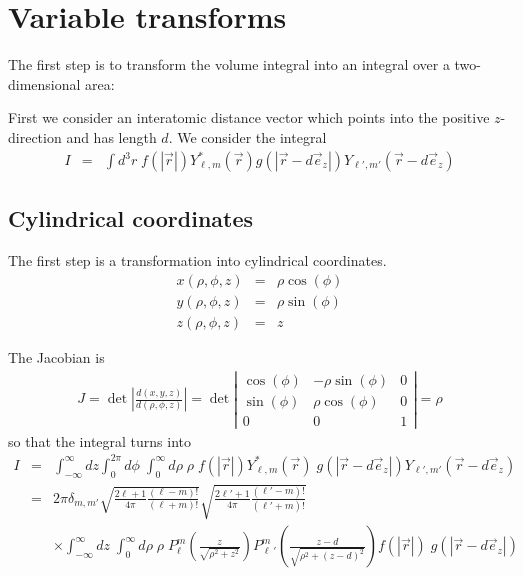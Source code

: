 \documentclass[11pt,a4paper]{report}
\begin{document}
\section{Variable transforms}
The first step is to transform the volume integral into an integral
over a two-dimensional area:

First we consider an interatomic distance vector which points into the
positive $z$-direction and has length $d$. We consider the integral
\begin{eqnarray*}
I&=&\int d^3r\; f(|\vec{r}|)Y^*_{\ell,m}(\vec{r})g(|\vec{r}-d\vec{e}_z|)
Y_{\ell',m'}(\vec{r}-d\vec{e}_z)
\end{eqnarray*}

\subsection{Cylindrical coordinates}
The first step is a transformation into cylindrical coordinates.
\begin{eqnarray*}
x(\rho,\phi,z)&=&\rho\cos(\phi)
\\
y(\rho,\phi,z)&=&\rho\sin(\phi)
\\
z(\rho,\phi,z)&=&z
\end{eqnarray*}

The Jacobian is 
\begin{eqnarray*}
J=
\det\left|\frac{d(x,y,z)}{d(\rho,\phi,z)}\right|=
\det\left|\begin{array}{ccc}\cos(\phi)& -\rho\sin(\phi)& 0\\
\sin(\phi)&\rho\cos(\phi)&0\\0&0&1\end{array}\right|
=\rho
\end{eqnarray*}
so that the integral turns into
\begin{eqnarray*}
I&=&\int_{-\infty}^\infty dz\int_0^{2\pi} d\phi\;
\int_0^\infty d\rho\;\rho\;
f(|\vec{r}|)Y^*_{\ell,m}(\vec{r})\;
g(|\vec{r}-d\vec{e}_z|)Y_{\ell',m'}(\vec{r}-d\vec{e}_z)
\\
&=&2\pi\delta_{m,m'}
\sqrt{\frac{2\ell+1}{4\pi}\frac{(\ell-m)!}{(\ell+m)!}}
\sqrt{\frac{2\ell'+1}{4\pi}\frac{(\ell'-m)!}{(\ell'+m)!}}
\\
&&\times\int_{-\infty}^\infty dz\;
\int_0^\infty d\rho\;\rho\; 
P^{m}_\ell\left(\frac{z}{\sqrt{\rho^2+z^2}}\right)
P^{m}_{\ell\,'}\left(\frac{z-d}{\sqrt{\rho^2+(z-d)^2}}\right)
f(|\vec{r}|)\;g(|\vec{r}-d\vec{e}_z|)
\end{eqnarray*}
\end{document}
